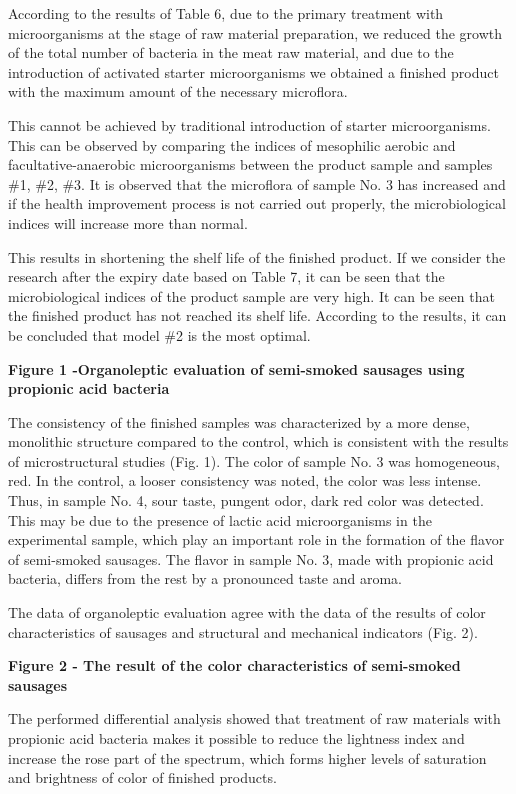According to the results of Table 6, due to the primary treatment with
microorganisms at the stage of raw material preparation, we reduced the
growth of the total number of bacteria in the meat raw material, and due
to the introduction of activated starter microorganisms we obtained a
finished product with the maximum amount of the necessary microflora.

This cannot be achieved by traditional introduction of starter
microorganisms. This can be observed by comparing the indices of
mesophilic aerobic and facultative-anaerobic microorganisms between the
product sample and samples \#1, \#2, \#3. It is observed that the
microflora of sample No. 3 has increased and if the health improvement
process is not carried out properly, the microbiological indices will
increase more than normal.

This results in shortening the shelf life of the finished product. If we
consider the research after the expiry date based on Table 7, it can be
seen that the microbiological indices of the product sample are very
high. It can be seen that the finished product has not reached its shelf
life. According to the results, it can be concluded that model \#2 is
the most optimal.

{\bfseries Figure 1 -Organoleptic evaluation of semi-smoked sausages using
propionic acid bacteria}

The consistency of the finished samples was characterized by a more
dense, monolithic structure compared to the control, which is consistent
with the results of microstructural studies (Fig. 1). The color of
sample No. 3 was homogeneous, red. In the control, a looser consistency
was noted, the color was less intense. Thus, in sample No. 4, sour
taste, pungent odor, dark red color was detected. This may be due to the
presence of lactic acid microorganisms in the experimental sample, which
play an important role in the formation of the flavor of semi-smoked
sausages. The flavor in sample No. 3, made with propionic acid bacteria,
differs from the rest by a pronounced taste and aroma.

The data of organoleptic evaluation agree with the data of the results
of color characteristics of sausages and structural and mechanical
indicators (Fig. 2).

{\bfseries Figure 2 - The result of the color characteristics of
semi-smoked sausages}

The performed differential analysis showed that treatment of raw
materials with propionic acid bacteria makes it possible to reduce the
lightness index and increase the rose part of the spectrum, which forms
higher levels of saturation and brightness of color of finished
products.

